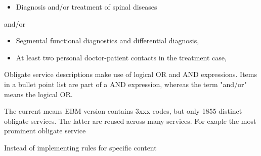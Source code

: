 \begin{itemize}
    \item Diagnosis and/or treatment of spinal diseases
\end{itemize}
and/or
\begin{itemize}
    \item Segmental functional diagnostics and differential diagnosis,
    \item At least two personal doctor-patient contacts in the treatment case,
\end{itemize}

Obligate service descriptions make use of logical OR and AND expressions.
Items in a bullet point list are part of a AND expression, whereas the term "and/or" means the logical OR.

The current means EBM version contains 3xxx codes, but only 1855 distinct obligate services.
The latter are reused across many services. For exaple the most prominent obligate service

Instead of implementing rules for specific content
